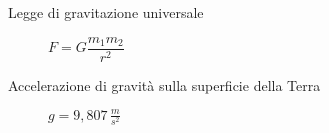 \documentclass[a4paper,11pt,italian]{article}
\begin{document}
\begin{description}
%   
%   
  
  \item[Legge di gravitazione universale] 
  $ F = G \dfrac{m_1 m_2}{r^2} $
  
%   
  \item[Accelerazione di gravità sulla superficie della Terra] 
$ g =  9, 807 \, \frac{m}{s^2} $
  
%   
%
%   
\end{description}
\end{document}
